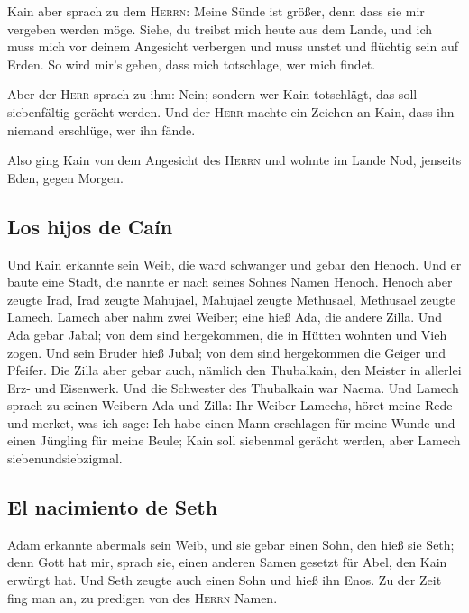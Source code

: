  Kain aber sprach zu dem \textsc{Herrn}: Meine Sünde ist
größer, denn dass sie mir vergeben werden möge.  Siehe,
du treibst mich heute aus dem Lande, und ich muss mich vor deinem
Angesicht verbergen und muss unstet und flüchtig sein auf Erden. So wird
mir's gehen, dass mich totschlage, wer mich findet.

 Aber der \textsc{Herr} sprach zu ihm: Nein; sondern wer
Kain totschlägt, das soll siebenfältig gerächt werden. Und der
\textsc{Herr} machte ein Zeichen an Kain, dass ihn niemand erschlüge,
wer ihn fände.

 Also ging Kain von dem Angesicht des \textsc{Herrn} und
wohnte im Lande Nod, jenseits Eden, gegen Morgen.

\hypertarget{los-hijos-de-cauxedn}{%
\subsection{Los hijos de Caín}\label{los-hijos-de-cauxedn}}

 Und Kain erkannte sein Weib, die ward schwanger und
gebar den Henoch. Und er baute eine Stadt, die nannte er nach seines
Sohnes Namen Henoch.  Henoch aber zeugte Irad, Irad
zeugte Mahujael, Mahujael zeugte Methusael, Methusael zeugte Lamech.
 Lamech aber nahm zwei Weiber; eine hieß Ada, die andere
Zilla.  Und Ada gebar Jabal; von dem sind hergekommen,
die in Hütten wohnten und Vieh zogen.  Und sein Bruder
hieß Jubal; von dem sind hergekommen die Geiger und Pfeifer.
 Die Zilla aber gebar auch, nämlich den Thubalkain, den
Meister in allerlei Erz- und Eisenwerk. Und die Schwester des Thubalkain
war Naema.  Und Lamech sprach zu seinen Weibern Ada und
Zilla: Ihr Weiber Lamechs, höret meine Rede und merket, was ich sage:
Ich habe einen Mann erschlagen für meine Wunde und einen Jüngling für
meine Beule;  Kain soll siebenmal gerächt werden, aber
Lamech siebenundsiebzigmal.

\hypertarget{el-nacimiento-de-seth}{%
\subsection{El nacimiento de Seth}\label{el-nacimiento-de-seth}}

 Adam erkannte abermals sein Weib, und sie gebar einen
Sohn, den hieß sie Seth; denn Gott hat mir, sprach sie, einen anderen
Samen gesetzt für Abel, den Kain erwürgt hat.  Und Seth
zeugte auch einen Sohn und hieß ihn Enos. Zu der Zeit fing man an, zu
predigen von des \textsc{Herrn} Namen.

